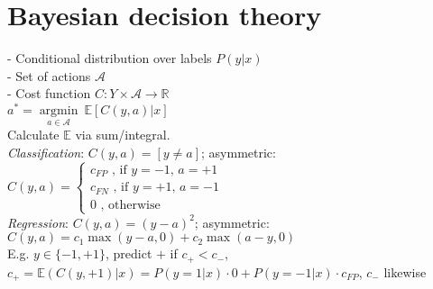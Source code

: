 \section*{Bayesian decision theory}
- Conditional distribution over labels $P(y|x)$\\
- Set of actions $\mathcal{A}$\\
- Cost function $C:Y\times \mathcal{A} \rightarrow \mathbb{R}$\\
$a^* = \underset{a \in \mathcal{A}}{\operatorname{argmin}} ~ \mathbb{E}[C(y,a)|x]$\\
Calculate $\mathbb{E}$ via sum/integral.\\
\emph{Classification}: $C(y,a) = [y \not = a]$; asymmetric: \\
$C(y,a) =
 \begin{cases}
 	c_{FP} \text{ , if $y=-1$, $a=+1$}\\
		c_{FN} \text{ , if $y=+1$, $a=-1$}\\
		0 \text{ , otherwise}
 \end{cases}$\\
 \emph{Regression}:  $C(y,a) = (y-a)^2$; asymmetric: $C(y,a) = c_1 \max(y-a,0) + c_2 \max(a-y,0)$\\
E.g. $y \in \{-1,+1\}$, predict $+$ if $c_+ < c_-$, $c_+ = \mathbb{E}(C(y, +1)|x) = P(y = 1|x) \cdot 0 + P(y = -1|x) \cdot c_{FP}$, $c_-$ likewise




